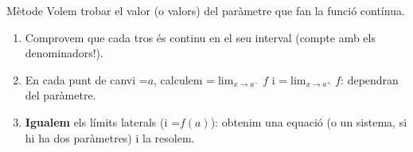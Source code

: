 \documentclass[11pt,a4paper]{article}
\newcommand{\fmm}[1]{\setbox0=\hbox{$#1$}\ifdim\wd0>\linewidth\[#1\]\else\mbox{\box0}\fi}
\begin{document}
  

  
\begin{fmdef}{Mètode}
Volem trobar el valor (o valors) del paràmetre que fan la funció contínua.

      
\begin{enumerate}
\item Comprovem que cada tros és continu en el seu interval (compte amb els denominadors!).
\item En cada punt de canvi \fmm{a}, calculem \fmm{\lim_{x\to a^-}f} i \fmm{\lim_{x\to a^+}f}: dependran del paràmetre.
\item \textbf{Igualem} els límits laterals (i \fmm{f(a)}): obtenim una equació (o un sistema, si hi ha dos paràmetres) i la resolem.
\end{enumerate}
\end{fmdef}
\end{document}
